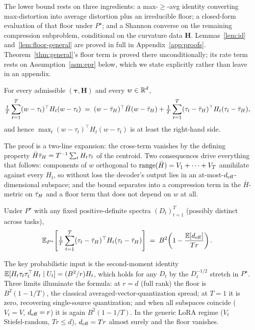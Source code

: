 The lower bound rests on three ingredients: a max-$\geq$-avg identity
converting max-distortion into average distortion plus an irreducible
floor; a closed-form evaluation of that floor under $P^\star$; and a
Shannon converse on the remaining compression subproblem, conditional
on the curvature data $\boldsymbol H$. Lemmas~\ref{lem:id}
and~\ref{lem:floor-general} are proved in full in
Appendix~\ref{app:proofs}. Theorem~\ref{thm:general}'s floor term is proved
there unconditionally; its rate term rests on Assumption~\ref{asm:epr} below,
which we state explicitly rather than leave in an appendix.

\begin{lemma}\label{lem:id}
For every admissible $(\boldsymbol\tau, \boldsymbol H)$ and every
$w\in\mathbb{R}^d$,
\begin{equation}\label{eq:id-eq}
  \tfrac1T\sum_{t=1}^T (w-\tau_t)^\top H_t (w-\tau_t)
  \;=\; (w-\bar{\tau}_H)^\top\bar H(w-\bar{\tau}_H) + \tfrac1T\sum_{t=1}^T
  (\tau_t-\bar{\tau}_H)^\top H_t (\tau_t-\bar{\tau}_H),
\end{equation}
and hence $\max_t (w-\tau_t)^\top H_t(w-\tau_t)$ is at least the
right-hand side.
\end{lemma}

The proof is a two-line expansion: the cross-term vanishes by the
defining property $\bar H\bar{\tau}_H = T^{-1}\sum_t H_t\tau_t$ of the
centroid. Two consequences drive everything that follows: components
of $w$ orthogonal to $\operatorname{range}(\bar H) = V_1+\cdots+V_T$ annihilate
against every $H_t$, so without loss the decoder's output lies in an
at-most-$d_{\mathrm{eff}}$-dimensional subspace; and the bound separates into a
compression term in the $\bar H$-metric on $\bar{\tau}_H$ and a floor term
that does not depend on $w$ at all.

\begin{lemma}\label{lem:floor-general}
Under $P^\star$ with any fixed positive-definite spectra
$(D_t)_{t=1}^T$ (possibly distinct across tasks),
\begin{equation}\label{eq:floor-closed}
  \mathbb{E}_{P^\star}\!\left[\tfrac1T\sum_{t=1}^T(\tau_t-\bar{\tau}_H)^\top
   H_t(\tau_t-\bar{\tau}_H)\right]
  \;=\; B^2\!\left(1 - \frac{\mathbb{E}[d_{\mathrm{eff}}]}{Tr}\right).
\end{equation}
\end{lemma}

The key probabilistic input is the second-moment identity
$\mathbb{E}[H_t\tau_t\tau_t^\top H_t\mid U_t] = (B^2/r) H_t$, which holds for
any $D_t$ by the $D_t^{-1/2}$ stretch in $P^\star$. Three limits
illuminate the formula: at $r = d$ (full rank) the floor is
$B^2(1 - 1/T)$, the classical averaged-vector-quantization spread; at
$T = 1$ it is zero, recovering single-source quantization; and when
all subspaces coincide ($V_t = V$, $d_{\mathrm{eff}} = r$) it is again
$B^2(1 - 1/T)$. In the generic LoRA regime ($V_t$ Stiefel-random,
$Tr \leq d$), $d_{\mathrm{eff}} = Tr$ almost surely and the floor vanishes.

